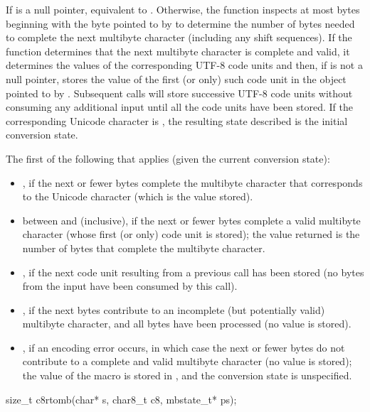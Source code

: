 \begin{itemdescr}
\pnum
\effects
If  is a null pointer,
equivalent to .
Otherwise, the function inspects at most  bytes
beginning with the byte pointed to by 
to determine the number of bytes needed to complete
the next multibyte character (including any shift sequences).
If the function determines
that the next multibyte character is complete and valid,
%
it determines the values of the corresponding UTF-8 code units and then,
if  is not a null pointer,
stores the value of the first (or only) such code unit
in the object pointed to by .
Subsequent calls will store successive UTF-8 code units
without consuming any additional input
until all the code units have been stored.
If the corresponding Unicode character is ,
the resulting state described is the initial conversion state.

\pnum
\returns
The first of the following that applies (given the current conversion state):
\begin{itemize}
\item {}, if the next  or fewer bytes complete
the multibyte character
that corresponds to the  Unicode character
(which is the value stored).
\item between  and  (inclusive),
if the next  or fewer bytes complete a valid multibyte character
(whose first (or only) code unit is stored);
the value returned is the number of bytes that complete the multibyte character.
\item {}, if the next code unit
resulting from a previous call has been stored
(no bytes from the input have been consumed by this call).
\item {}, if the next  bytes
contribute to an incomplete (but potentially valid) multibyte character, and
all  bytes have been processed (no value is stored).
\item {}, if an encoding error occurs,
in which case the next  or fewer bytes do not contribute to
a complete and valid multibyte character (no value is stored);
the value of the macro  is stored in , and
the conversion state is unspecified.
\end{itemize}
\end{itemdescr}

%
\begin{itemdecl}
size_t c8rtomb(char* s, char8_t c8, mbstate_t* ps);
\end{itemdecl}

